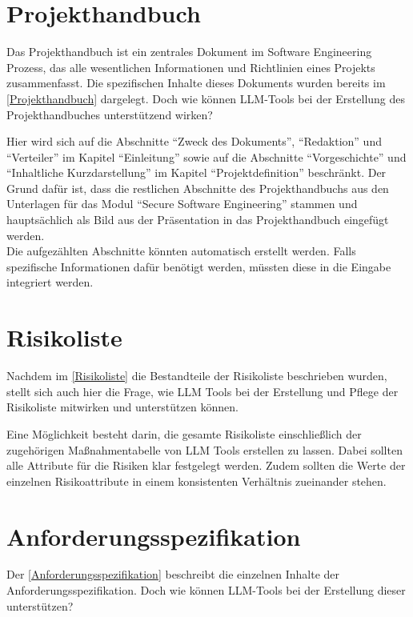 \section{Projekthandbuch}  \label{LLMProjekthandbuch}

Das Projekthandbuch ist ein zentrales Dokument im Software Engineering Prozess, das alle wesentlichen Informationen und 
Richtlinien eines Projekts zusammenfasst. Die spezifischen Inhalte dieses Dokuments wurden bereits im 
\autoref{Projekthandbuch} dargelegt. Doch wie können LLM-Tools bei der Erstellung des 
Projekthandbuches unterstützend wirken?

Hier wird sich auf die Abschnitte ``Zweck des Dokuments'', ``Redaktion'' und ``Verteiler'' im Kapitel ``Einleitung'' 
sowie auf die Abschnitte ``Vorgeschichte'' und ``Inhaltliche Kurzdarstellung'' im Kapitel ``Projektdefinition'' 
beschränkt. Der Grund dafür ist, dass die restlichen Abschnitte des Projekthandbuchs aus den Unterlagen für 
das Modul ``Secure Software Engineering'' stammen und hauptsächlich als Bild aus der Präsentation in das Projekthandbuch 
eingefügt werden.\\
Die aufgezählten Abschnitte könnten automatisch erstellt werden. Falls spezifische Informationen dafür benötigt 
werden, müssten diese in die Eingabe integriert werden.

\section{Risikoliste}  \label{LLMRisikoliste}

Nachdem im \autoref{Risikoliste} die Bestandteile der Risikoliste beschrieben wurden, stellt sich auch hier die Frage, 
wie LLM Tools bei der Erstellung und Pflege der Risikoliste mitwirken und unterstützen können.

Eine Möglichkeit besteht darin, die gesamte Risikoliste einschließlich der zugehörigen Maßnahmentabelle von LLM Tools 
erstellen zu lassen. Dabei sollten alle Attribute für die Risiken klar festgelegt werden. Zudem sollten die Werte 
der einzelnen Risikoattribute in einem konsistenten Verhältnis zueinander stehen.


\section{Anforderungsspezifikation}  \label{LLMAnforderungsspezifikation}

Der \autoref{Anforderungsspezifikation} beschreibt die einzelnen Inhalte der Anforderungsspezifikation. Doch wie 
können LLM-Tools bei der Erstellung dieser unterstützen?

